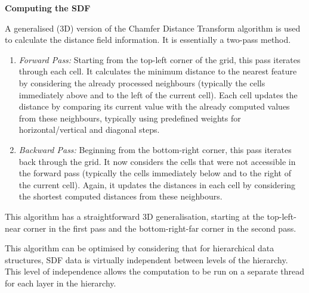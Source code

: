 \textbf{Computing the SDF}

A generalised (3D) version of the Chamfer Distance Transform algorithm\supercite{chamfer} is used to calculate the distance field information.
It is essentially a two-pass method.
\begin{enumerate}
  \item \emph{Forward Pass:} Starting from the top-left corner of the grid, this pass iterates through each cell. It calculates the minimum distance to the nearest feature by considering the already processed neighbours (typically the cells immediately above and to the left of the current cell). Each cell updates the distance by comparing its current value with the already computed values from these neighbours, typically using predefined weights for horizontal/vertical and diagonal steps.

  \item \emph{Backward Pass:} Beginning from the bottom-right corner, this pass iterates back through the grid. It now considers the cells that were not accessible in the forward pass (typically the cells immediately below and to the right of the current cell). Again, it updates the distances in each cell by considering the shortest computed distances from these neighbours.
\end{enumerate}
This algorithm has a straightforward 3D generalisation, starting at the top-left-near corner in the first pass and the bottom-right-far corner in the second pass.

This algorithm can be optimised by considering that for hierarchical data structures, SDF data is virtually independent between levels of the hierarchy.
This level of independence allows the computation to be run on a separate thread for each layer in the hierarchy.
